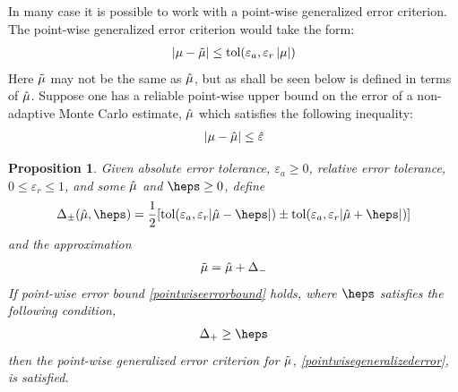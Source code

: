 \documentclass{iitthesis}
\newtheorem{proposition}[theorem]{Proposition}
\begin{document}
In many case it is possible to work with a point-wise generalized error criterion. 
The point-wise generalized error criterion would take the form:
\begin{align}|\mu -\tilde{\mu}| \leq \text{tol} (\varepsilon_a,\varepsilon_r \left \lvert \mu \right \rvert) \label{pointwisegeneralizederror} 
\end{align}
Here $\tilde{\mu}$ may not be the same as $\hat{\mu}$, but as shall be seen below is defined in terms of $\hat{\mu}$. Suppose one has a reliable point-wise upper bound on the error of a non-adaptive Monte Carlo estimate, $\hat{\mu}$ which satisfies the following inequality:
\begin{align}
|\mu-\hat{\mu}| \leq \hat{\varepsilon}  \label{pointwiseerrorbound} 
\end{align}
\begin{proposition}\label{meanMCgProp}
Given absolute error tolerance, $\varepsilon_a\geq 0$, relative error tolerance, $0 \leq \varepsilon_r\le 1$, and some $\hat{\mu}$ and $\heps\geq 0$, define
\begin{align}\Delta_{\pm}(\hmu,\heps) = \frac{1}{2} [\text{tol}(\varepsilon_a, \varepsilon_r |\hmu-\heps|) \pm \text{tol}(\varepsilon_a, \varepsilon_r |\hmu+\heps|)] \label{deltadef}
\end{align}
and the approximation
\begin{align}
\tilde{\mu} = \hat{\mu} + \Delta_{-} \label{appxsol}
\end{align}
If point-wise error bound  \eqref{pointwiseerrorbound}  holds, where $\heps$ satisfies the following condition,
\begin{align}\Delta_{+} \geq \heps\label{deltacondition}
\end{align}
 then the point-wise generalized error criterion for $\tilde{\mu}$, \eqref{pointwisegeneralizederror}, is satisfied. 
 \end{proposition}
\end{document}
